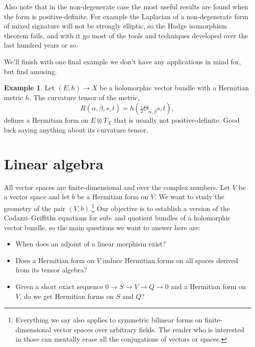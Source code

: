 \documentclass[10pt,a4paper]{amsart}
\theoremstyle{definition}
\newtheorem{exam}[theo]{Example}
\def\ov#1{\overline{#1}}
\begin{document}
Also note that in the non-degenerate case the most useful results are found when the form is positive-definite. For example the Laplacian of a non-degenerate form of mixed signature will not be strongly elliptic, so the Hodge isomorphism theorem fails, and with it go most of the tools and techniques developed over the last hundred years or so.

We'll finish with one final example we don't have any applications in mind for, but find amusing.

\begin{exam}
Let $(E,h) \to X$ be a holomorphic vector bundle with a Hermitian metric $h$. The curvature tensor of the metric,
\[
  R(\alpha, \ov\beta, s, \ov t)
  = h(\tfrac i2 \Theta_{\alpha, \ov\beta}s, \ov t),
\]
defines a Hermitian form on $E \otimes T_{X}$ that is usually not positive-definite. Good luck saying anything about its curvature tensor.
\end{exam}



\section{Linear algebra}
\label{sec:degenerate-linear-algebra}



All vector spaces are finite-dimensional and over the complex numbers. Let $V$ be a vector space and let $b$ be a Hermitian form on $V$. We want to study the geometry of the pair $(V,b)$.\footnote{Everything we say also applies to symmetric bilinear forms on finite-dimensional vector spaces over arbitrary fields. The reader who is interested in those can mentally erase all the conjugations of vectors or spaces.}
Our objective is to establish a version of the Codazzi--Griffiths equations for sub- and quotient bundles of a holomorphic vector bundle, so the main questions we want to answer here are:
\begin{itemize}
\item
When does an adjoint of a linear morphism exist?

\item
Does a Hermitian form on $V$ induce Hermitian forms on all spaces derived from its tensor algebra?

\item
Given a short exact sequence $0 \to S \to V \to Q \to 0$ and a Hermitian form on $V$, do we get Hermitian forms on $S$ and $Q$?
\end{itemize}
\end{document}
